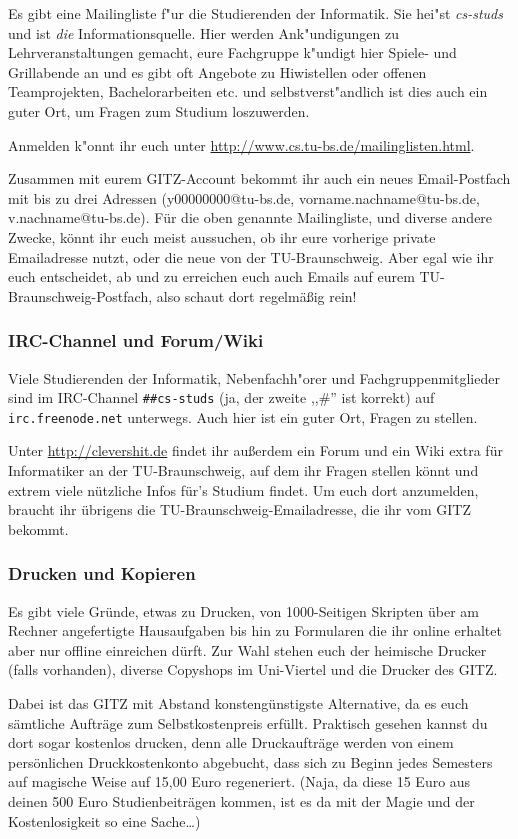 Es gibt eine Mailingliste f"ur die Studierenden der Informatik.
Sie hei"st \emph{cs-studs} und ist \emph{die} Informationsquelle.
Hier werden Ank"undigungen zu Lehrveranstaltungen gemacht, eure
Fachgruppe k"undigt hier Spiele- und Grillabende an und es gibt
oft Angebote zu Hiwistellen oder offenen Teamprojekten,
Bachelorarbeiten etc. und selbstverst"andlich ist dies auch ein
guter Ort, um Fragen zum Studium loszuwerden.

Anmelden k"onnt ihr euch unter
\url{http://www.cs.tu-bs.de/mailinglisten.html}.

Zusammen mit eurem GITZ-Account bekommt ihr auch ein neues 
Email-Postfach mit bis zu drei Adressen (y00000000@tu-bs.de, 
vorname.nachname@tu-bs.de, v.nachname@tu-bs.de). Für die oben 
genannte Mailingliste, und diverse andere Zwecke, könnt ihr euch 
meist aussuchen, ob ihr eure vorherige private Emailadresse nutzt, 
oder die neue von der TU-Braunschweig. Aber egal wie ihr euch 
entscheidet, ab und zu erreichen euch auch Emails auf eurem 
TU-Braunschweig-Postfach, also schaut dort regelmäßig rein!

\subsubsection{IRC-Channel und Forum/Wiki}

Viele Studierenden der Informatik, Nebenfachh"orer und
Fachgruppenmitglieder sind im IRC-Channel \texttt{\#\#cs-studs}
(ja, der zweite ,,\#'' ist korrekt) auf \texttt{irc.freenode.net}
unterwegs. Auch hier ist ein guter Ort, Fragen zu stellen.

Unter \url{http://clevershit.de} findet ihr außerdem ein Forum und ein 
Wiki extra für Informatiker an der TU-Braunschweig, auf dem ihr Fragen 
stellen könnt und extrem viele nützliche Infos für's Studium findet. Um 
euch dort anzumelden, braucht ihr übrigens die TU-Braunschweig-Emailadresse, 
die ihr vom GITZ bekommt.

\label{kopieren}
\subsubsection{Drucken und Kopieren}
Es gibt viele Gründe, etwas zu Drucken, von 1000-Seitigen Skripten über am Rechner angefertigte Hausaufgaben bis hin zu Formularen die ihr online erhaltet aber nur offline einreichen dürft. Zur Wahl stehen euch der heimische Drucker (falls vorhanden), diverse Copyshops im Uni-Viertel und die Drucker des GITZ.

Dabei ist das GITZ mit Abstand konstengünstigste Alternative, da es euch sämtliche Aufträge zum Selbstkostenpreis erfüllt. Praktisch gesehen kannst du dort sogar kostenlos drucken, denn alle Druckaufträge werden von einem persönlichen Druckkostenkonto abgebucht, dass sich zu Beginn jedes Semesters auf magische Weise auf 15,00 Euro regeneriert. (Naja, da diese 15 Euro aus deinen 500 Euro Studienbeiträgen kommen, ist es da mit der Magie und der Kostenlosigkeit so eine Sache\ldots)

